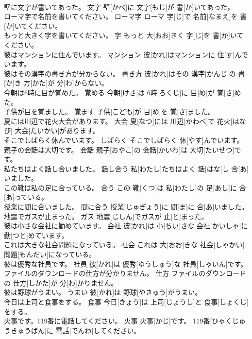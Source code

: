 \documentclass[8pt]{extreport}
\begin{document}
\begin{CJK}{UTF8}{min}
\\	壁に文字が書いてあった。	文字	壁[かべ]に 文字[もじ]が 書[か]いてあった。	
\\	ローマ字で名前を書いてください。	ローマ字	ローマ 字[じ]で 名前[なまえ]を 書[か]いてください。	
\\	もっと大きく字を書いてください。	字	もっと 大[おお]きく 字[じ]を 書[か]いてください。	
\\	彼はマンションに住んでいます。	マンション	彼[かれ]はマンションに 住[す]んでいます。	
\\	彼はその漢字の書き方が分からない。	書き方	彼[かれ]はその 漢字[かんじ]の 書[か]き 方[かた]が 分[わ]からない。	
\\	今朝は6時に目が覚めた。	覚める	今朝[けさ]は 6時[ろくじ]に 目[め]が 覚[さ]めた。	
\\	子供が目を覚ました。	覚ます	子供[こども]が 目[め]を 覚[さ]ました。	
\\	夏には川辺で花火大会があります。	大会	夏[なつ]には 川辺[かわべ]で 花火[はなび] 大会[たいかい]があります。	
\\	そこでしばらく休んでいます。	しばらく	そこでしばらく 休[やす]んでいます。	
\\	親子の会話は大切です。	会話	親子[おやこ]の 会話[かいわ]は 大切[たいせつ]です。	
\\	私たちはよく話し合いました。	話し合う	私[わたし]たちはよく 話[はな]し 合[あ]いました。	
\\	この靴は私の足に合っている。	合う	この 靴[くつ]は 私[わたし]の 足[あし]に 合[あ]っている。	
\\	授業に間に合いました。	間に合う	授業[じゅぎょう]に 間[ま]に 合[あ]いました。	
\\	地震でガスが止まった。	ガス	地震[じしん]でガスが 止[と]まった。	
\\	彼は小さな会社に勤めています。	会社	彼[かれ]は 小[ちい]さな 会社[かいしゃ]に 勤[つと]めています。	
\\	これは大きな社会問題になっている。	社会	これは 大[おお]きな 社会[しゃかい] 問題[もんだい]になっている。	
\\	彼は優秀な社員です。	社員	彼[かれ]は 優秀[ゆうしゅう]な 社員[しゃいん]です。	
\\	ファイルのダウンロードの仕方が分かりません。	仕方	ファイルのダウンロードの 仕方[しかた]が 分[わ]かりません。	
\\	彼は野球がうまい。	うまい	彼[かれ]は 野球[やきゅう]がうまい。	
\\	今日は上司と食事をする。	食事	今日[きょう]は 上司[じょうし]と 食事[しょくじ]をする。	
\\	火事です。119番に電話してください。	火事	火事[かじ]です。 119番[ひゃくじゅうきゅうばん]に 電話[でんわ]してください。	

\end{CJK}
\end{document}
